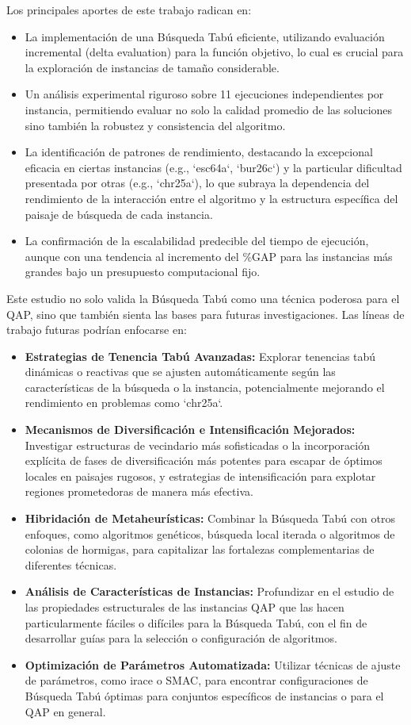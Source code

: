 \documentclass[12pt, a4paper]{article}
\begin{document}
Los principales aportes de este trabajo radican en:
\begin{itemize}
    \item La implementación de una Búsqueda Tabú eficiente, utilizando evaluación incremental (delta evaluation) para la función objetivo, lo cual es crucial para la exploración de instancias de tamaño considerable.
    \item Un análisis experimental riguroso sobre 11 ejecuciones independientes por instancia, permitiendo evaluar no solo la calidad promedio de las soluciones sino también la robustez y consistencia del algoritmo.
    \item La identificación de patrones de rendimiento, destacando la excepcional eficacia en ciertas instancias (e.g., `esc64a`, `bur26c`) y la particular dificultad presentada por otras (e.g., `chr25a`), lo que subraya la dependencia del rendimiento de la interacción entre el algoritmo y la estructura específica del paisaje de búsqueda de cada instancia.
    \item La confirmación de la escalabilidad predecible del tiempo de ejecución, aunque con una tendencia al incremento del \%GAP para las instancias más grandes bajo un presupuesto computacional fijo.
\end{itemize}

Este estudio no solo valida la Búsqueda Tabú como una técnica poderosa para el QAP, sino que también sienta las bases para futuras investigaciones. Las líneas de trabajo futuras podrían enfocarse en:
\begin{itemize}
    \item \textbf{Estrategias de Tenencia Tabú Avanzadas:} Explorar tenencias tabú dinámicas o reactivas que se ajusten automáticamente según las características de la búsqueda o la instancia, potencialmente mejorando el rendimiento en problemas como `chr25a`.
    \item \textbf{Mecanismos de Diversificación e Intensificación Mejorados:} Investigar estructuras de vecindario más sofisticadas o la incorporación explícita de fases de diversificación más potentes para escapar de óptimos locales en paisajes rugosos, y estrategias de intensificación para explotar regiones prometedoras de manera más efectiva.
    \item \textbf{Hibridación de Metaheurísticas:} Combinar la Búsqueda Tabú con otros enfoques, como algoritmos genéticos, búsqueda local iterada o algoritmos de colonias de hormigas, para capitalizar las fortalezas complementarias de diferentes técnicas.
    \item \textbf{Análisis de Características de Instancias:} Profundizar en el estudio de las propiedades estructurales de las instancias QAP que las hacen particularmente fáciles o difíciles para la Búsqueda Tabú, con el fin de desarrollar guías para la selección o configuración de algoritmos.
    \item \textbf{Optimización de Parámetros Automatizada:} Utilizar técnicas de ajuste de parámetros, como irace o SMAC, para encontrar configuraciones de Búsqueda Tabú óptimas para conjuntos específicos de instancias o para el QAP en general.
\end{itemize}
\end{document}
